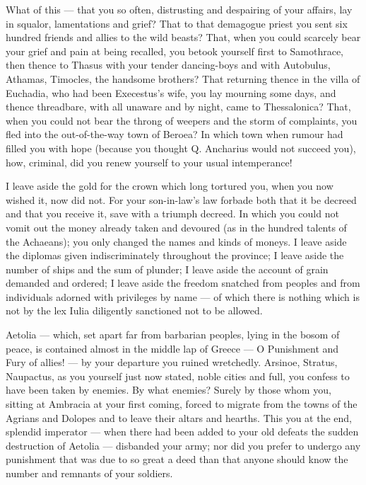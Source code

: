  What of this — that you so often, distrusting and despairing of your affairs, lay in squalor, lamentations and grief? That to that demagogue priest you sent six hundred friends and allies to the wild beasts? That, when you could scarcely bear your grief and pain at being recalled, you betook yourself first to Samothrace, then thence to Thasus with your tender dancing-boys and with Autobulus, Athamas, Timocles, the handsome brothers? That returning thence in the villa of Euchadia, who had been Execestus's wife, you lay mourning some days, and thence threadbare, with all unaware and by night, came to Thessalonica? That, when you could not bear the throng of weepers and the storm of complaints, you fled into the out-of-the-way town of Beroea? In which town when rumour had filled you with hope (because you thought Q. Ancharius would not succeed you), how, criminal, did you renew yourself to your usual intemperance!

 I leave aside the gold for the crown which long tortured you, when you now wished it, now did not. For your son-in-law's law forbade both that it be decreed and that you receive it, save with a triumph decreed. In which you could not vomit out the money already taken and devoured (as in the hundred talents of the Achaeans); you only changed the names and kinds of moneys. I leave aside the diplomas given indiscriminately throughout the province; I leave aside the number of ships and the sum of plunder; I leave aside the account of grain demanded and ordered; I leave aside the freedom snatched from peoples and from individuals adorned with privileges by name — of which there is nothing which is not by the lex Iulia diligently sanctioned not to be allowed.

 Aetolia — which, set apart far from barbarian peoples, lying in the bosom of peace, is contained almost in the middle lap of Greece — O Punishment and Fury of allies! — by your departure you ruined wretchedly. Arsinoe, Stratus, Naupactus, as you yourself just now stated, noble cities and full, you confess to have been taken by enemies. By what enemies? Surely by those whom you, sitting at Ambracia at your first coming, forced to migrate from the towns of the Agrians and Dolopes and to leave their altars and hearths. This you at the end, splendid imperator — when there had been added to your old defeats the sudden destruction of Aetolia — disbanded your army; nor did you prefer to undergo any punishment that was due to so great a deed than that anyone should know the number and remnants of your soldiers.

